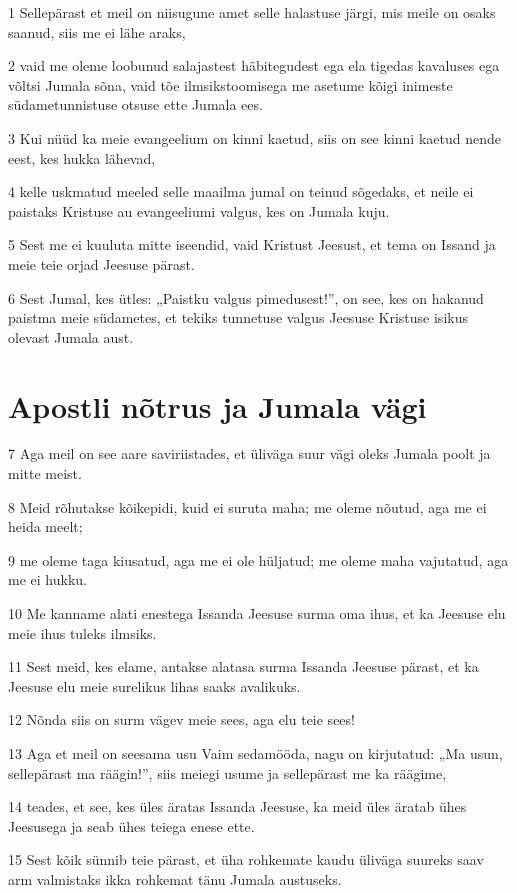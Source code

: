 \par 1 Sellepärast et meil on niisugune amet selle halastuse järgi, mis meile on osaks saanud, siis me ei lähe araks,
\par 2 vaid me oleme loobunud salajastest häbitegudest ega ela tigedas kavaluses ega võltsi Jumala sõna, vaid tõe ilmsikstoomisega me asetume kõigi inimeste südametunnistuse otsuse ette Jumala ees.
\par 3 Kui nüüd ka meie evangeelium on kinni kaetud, siis on see kinni kaetud nende eest, kes hukka lähevad,
\par 4 kelle uskmatud meeled selle maailma jumal on teinud sõgedaks, et neile ei paistaks Kristuse au evangeeliumi valgus, kes on Jumala kuju.
\par 5 Sest me ei kuuluta mitte iseendid, vaid Kristust Jeesust, et tema on Issand ja meie teie orjad Jeesuse pärast.
\par 6 Sest Jumal, kes ütles: „Paistku valgus pimedusest!”, on see, kes on hakanud paistma meie südametes, et tekiks tunnetuse valgus Jeesuse Kristuse isikus olevast Jumala aust.

\section*{Apostli nõtrus ja Jumala vägi}

\par 7 Aga meil on see aare saviriistades, et üliväga suur vägi oleks Jumala poolt ja mitte meist.
\par 8 Meid rõhutakse kõikepidi, kuid ei suruta maha; me oleme nõutud, aga me ei heida meelt;
\par 9 me oleme taga kiusatud, aga me ei ole hüljatud; me oleme maha vajutatud, aga me ei hukku.
\par 10 Me kanname alati enestega Issanda Jeesuse surma oma ihus, et ka Jeesuse elu meie ihus tuleks ilmsiks.
\par 11 Sest meid, kes elame, antakse alatasa surma Issanda Jeesuse pärast, et ka Jeesuse elu meie surelikus lihas saaks avalikuks.
\par 12 Nõnda siis on surm vägev meie sees, aga elu teie sees!
\par 13 Aga et meil on seesama usu Vaim sedamööda, nagu on kirjutatud: „Ma usun, sellepärast ma räägin!”, siis meiegi usume ja sellepärast me ka räägime,
\par 14 teades, et see, kes üles äratas Issanda Jeesuse, ka meid üles äratab ühes Jeesusega ja seab ühes teiega enese ette.
\par 15 Sest kõik sünnib teie pärast, et üha rohkemate kaudu üliväga suureks saav arm valmistaks ikka rohkemat tänu Jumala austuseks.


